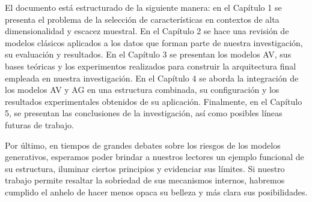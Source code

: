 El documento está estructurado de la siguiente manera: en el Capítulo 1 se presenta el problema de la selección de características en contextos de alta dimensionalidad y escacez muestral. En el Capítulo 2 se hace una revisión de modelos clásicos aplicados a los datos que forman parte de nuestra investigación, su evaluación y resultados. En el Capítulo 3 se presentan los modelos AV, sus bases teóricas y los experimentos realizados para construir la arquitectura final empleada en nuestra investigación. En el Capítulo 4 se aborda la integración de los modelos AV y AG en una estructura combinada, su configuración y los resultados experimentales obtenidos de su aplicación. Finalmente, en el Capítulo 5, se presentan las conclusiones de la investigación, así como posibles líneas futuras de trabajo.

Por último, en tiempos de grandes debates sobre los riesgos de los modelos generativos, esperamos poder brindar a nuestros lectores un ejemplo funcional de su estructura, iluminar ciertos principios y evidenciar sus límites. Si nuestro trabajo permite resaltar la sobriedad de sus mecanismos internos, habremos cumplido el anhelo de hacer menos opaca su belleza y más clara sus posibilidades.
